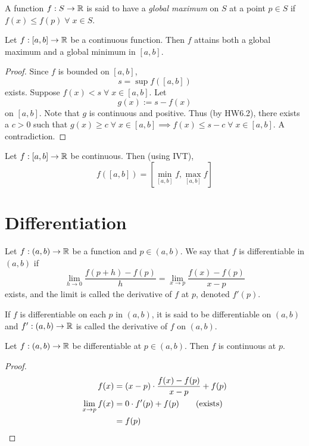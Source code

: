 \documentclass[12pt]{article}
\begin{document}
\begin{defn} \label{defn:global extrema}
    A function $f : S \to \mathbb{R}$ is said to have a \emph{global maximum} on $S$ at a point $p \in S$ if $f(x) \leq f(p) \;\forall\; x \in S$.
\end{defn}

\begin{thm} \label{thm:extreme value}
    Let $f : [a, b] \to \mathbb{R}$ be a continuous function. Then $f$ attains both a global maximum and a global minimum in $[a, b]$.
\end{thm}
\begin{proof}
    Since $f$ is bounded on $[a, b]$, \[
        s = \sup f([a, b])
    \] exists.
    Suppose $f(x) < s \;\forall\; x \in [a, b]$. Let \[
        g(x) := s - f(x)
    \] on $[a, b]$. Note that $g$ is continuous and positive. Thus (by HW6.2), there exists a $c > 0$ such that $g(x) \geq c \;\forall\; x \in [a, b] \implies f(x) \leq s - c \;\forall\; x \in [a, b]$. A contradiction.
\end{proof}
\begin{cor} \label{cor:continuous fn range}
    Let $f : [a, b] \to \mathbb{R}$ be continuous. Then (using IVT), \[
        f([a, b]) = [\min_{[a, b]} f, \max_{[a, b]} f]
    \]
\end{cor}


\section{Differentiation}

\begin{defn} \label{defn:dv}
    Let $f : (a, b) \to \mathbb{R}$ be a function and $p \in (a, b)$. We say that $f$ is differentiable in $(a, b)$ if \[
        \lim_{h \to 0} \frac{f(p + h) - f(p)}{h} = \lim_{x \to p} \frac{f(x) - f(p)}{x - p}
    \] exists, and the limit is called the derivative of $f$ at $p$, denoted $f'(p)$.

    If $f$ is differentiable on each $p$ in $(a, b)$, it is said to be differentiable on $(a, b)$ and $f' : (a, b) \to \mathbb{R}$ is called the derivative of $f$ on $(a, b)$.
\end{defn}

\begin{thm} \label{thm:diff=>cont}
    Let $f : (a, b) \to \mathbb{R}$ be differentiable at $p \in (a, b)$. Then $f$ is continuous at $p$.
\end{thm}
\begin{proof}
    \begin{align*}
        f(x) &= (x - p) \cdot \frac{f(x) - f(p)}{x - p} + f(p) \\
        \lim_{x \to p} f(x) &= 0 \cdot f'(p) + f(p) \tag{exists} \\
        &= f(p) \qedhere
    \end{align*}
\end{proof}
\end{document}
